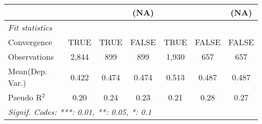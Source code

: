 \begin{tabular}{lcccccc}
                           &               &       & (NA)   &               &               & (NA)\\   
   \midrule
   \emph{Fit statistics}\\
   Convergence             &TRUE           & TRUE  & FALSE  & TRUE          & FALSE         & FALSE\\  
   Observations            & 2,844         & 899   & 899    & 1,930         & 657           & 657\\  
Mean(Dep. Var.) & 0.422 & 0.474 & 0.474 & 0.513 & 0.487 & 0.487 \\
   Pseudo R$^2$            & 0.20          & 0.24  & 0.23   & 0.21          & 0.28          & 0.27\\  
   \midrule \midrule
   \multicolumn{7}{l}{\emph{Signif. Codes: ***: 0.01, **: 0.05, *: 0.1}}\\
\end{tabular}
\par\endgroup
